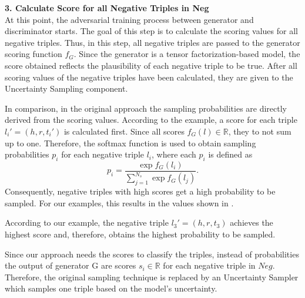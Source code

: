\textbf{3. Calculate Score for all Negative Triples in Neg}\\
At this point, the adversarial training process between generator and discriminator starts.
The goal of this step is to calculate the scoring values for all negative triples.
Thus, in this step, all negative triples are passed to the generator scoring function $f_G$.
Since the generator is a tensor factorization-based model, the score obtained reflects the plausibility of each negative triple to be true.
After all scoring values of the negative triples have been calculated, they are given to the Uncertainty Sampling component.

In comparison, in the original \kbgan approach the sampling probabilities are directly derived from the scoring values. 
According to the example, a score for each triple $l_i' = (h,r,t_i')$ is calculated first.
Since all scores $f_G(l) \in \mathbb{R}$, they to not sum up to one.
Therefore, the softmax function is used to obtain sampling probabilities $p_i$ for each negative triple $l_i$, where each $p_i$ is defined as
\begin{equation}
    p_i = \frac{\exp{f_G(l_i)}}{\sum_{j=1}^{N_s}{\exp{f_G(l_j)}}}.
\end{equation}
Consequently, negative triples with high scores get a high probability to be sampled.
For our examples, this results in the values shown in .

According to our example, the negative triple $l_3' = (h,r,t_3)$ achieves the highest score and, therefore, obtains the highest probability to be sampled.


Since our approach needs the scores to classify the triples, instead of probabilities  the output of generator G are scores $s_i \in \mathbb{R}$ for each negative triple in $Neg$.
Therefore, the original sampling technique is replaced by an Uncertainty Sampler which samples one triple based on the model's uncertainty.


